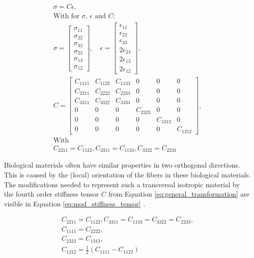 \begin{gather}
    \sigma = C \epsilon,\nonumber\\[1ex]
    \text{With for $\sigma$, $\epsilon$ and $C$:}\nonumber\\[1ex]
    \sigma  = \begin{bmatrix}
    \sigma_{11}\\
    \sigma_{22}\\
    \sigma_{33}\\
    \sigma_{23}\\
    \sigma_{13}\\
    \sigma_{12} \end{bmatrix},\quad
    \epsilon = \begin{bmatrix}
    \epsilon_{11}\\
    \epsilon_{22}\\
    \epsilon_{33}\\
    2 \epsilon_{23}\\
    2 \epsilon_{13}\\
    2 \epsilon_{12} \end{bmatrix},\nonumber\\
    C = \begin{bmatrix}
    C_{1111} & C_{1122} & C_{1133} & 0 & 0 & 0\\
    C_{2211} & C_{2222} & C_{2233} & 0 & 0 & 0\\
    C_{3311} & C_{3322} & C_{3333} & 0 & 0 & 0\\
    0 & 0 & 0 & C_{2323} & 0 & 0 \\
    0 & 0 & 0 & 0 & C_{1313} & 0 \\
    0 & 0 & 0 & 0 & 0 & C_{1212} \end{bmatrix},\nonumber\\[1ex]
    \text{With}\nonumber\\[1ex]
    C_{2211} = C_{1122}, C_{3311} = C_{1133}, C_{3322} = C_{2233}
    \label{eq:general_transformation}
\end{gather}

\qquad Biological materials often have similar properties in two orthogonal directions. This is caused by the (local) orientation of the fibers in these biological materials. The modifications needed to represent such a transversal isotropic material by the fourth order stiffness tensor $C$ from Equation \ref{eq:general_transformation} are visible in Equation \ref{eq:mod_stiffness_tensor} \cite{freutel2014finite}.

\begin{gather}
    C_{2211} = C_{1122}, C_{3311} = C_{1133} = C_{3322} = C_{2233},\nonumber\\
    C_{1111} = C_{2222},\nonumber\\
    C_{2323} = C_{1313},\nonumber\\
    C_{1212} = \frac{1}{2}(C_{1111} - C_{1122})
    \label{eq:mod_stiffness_tensor}
\end{gather}

